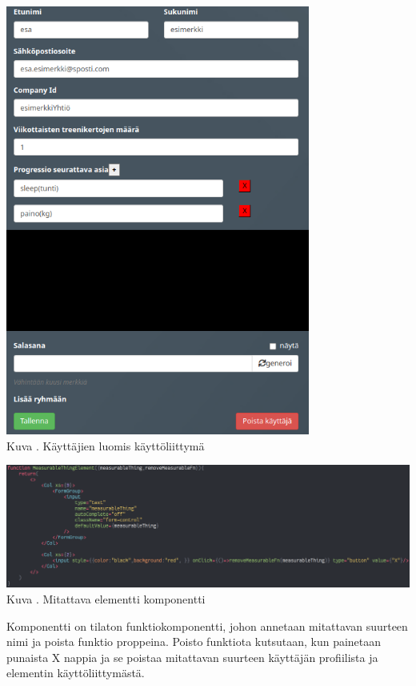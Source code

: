 \bigskip
\includegraphics[width = 10cm]{src/public/oppar/adminUserProfilePostcencoredroles.png}\\
Kuva \getImgCount {}. Käyttäjien luomis käyttöliittymä 
\bigskip


\includegraphics[width = 15cm]{src/public/oppar/measurableElementComponent.png}\\
Kuva \getImgCount {}. Mitattava elementti komponentti
\medskip

Komponentti on tilaton funktiokomponentti, johon annetaan mitattavan suurteen nimi ja poista funktio proppeina.
Poisto funktiota kutsutaan, kun painetaan punaista X nappia ja se poistaa mitattavan suurteen käyttäjän profiilista ja elementin käyttöliittymästä.
\medskip










